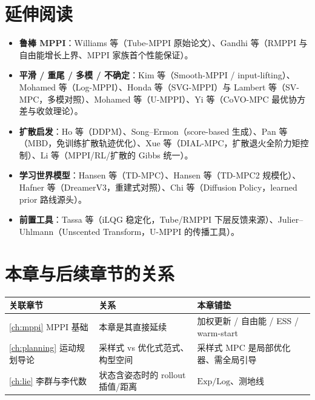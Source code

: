 \section*{延伸阅读}
\begin{itemize}
  \item \textbf{鲁棒 MPPI}：Williams 等\cite{williams2018robust}（Tube-MPPI 原始论文）、Gandhi 等\cite{gandhi2021robust}（RMPPI 与自由能增长上界、MPPI 家族首个性能保证）。
  \item \textbf{平滑 / 重尾 / 多模 / 不确定}：Kim 等\cite{kim2022smooth}（Smooth-MPPI / input-lifting）、Mohamed 等\cite{mohamed2022logmppi}（Log-MPPI）、Honda 等\cite{honda2024svgmppi}（SVG-MPPI）与 Lambert 等\cite{lambert2020svmpc}（SV-MPC，多模对照）、Mohamed 等\cite{mohamed2025umppi}（U-MPPI）、Yi 等\cite{yi2024covo}（CoVO-MPC 最优协方差与收敛理论）。
  \item \textbf{扩散启发}：Ho 等\cite{ho2020ddpm}（DDPM）、Song--Ermon\cite{song2019score}（score-based 生成）、Pan 等\cite{pan2024mbd}（MBD，免训练扩散轨迹优化）、Xue 等\cite{xue2025dial}（DIAL-MPC，扩散退火全阶力矩控制）、Li 等\cite{li2025unified}（MPPI/RL/扩散的 Gibbs 统一）。
  \item \textbf{学习世界模型}：Hansen 等\cite{hansen2022tdmpc}（TD-MPC）、Hansen 等\cite{hansen2024tdmpc2}（TD-MPC2 规模化）、Hafner 等\cite{hafner2023dreamerv3}（DreamerV3，重建式对照）、Chi 等\cite{chi2023diffusion}（Diffusion Policy，learned prior 路线源头）。
  \item \textbf{前置工具}：Tassa 等\cite{tassa2012ilqg}（iLQG 稳定化，Tube/RMPPI 下层反馈来源）、Julier--Uhlmann\cite{julier1997unscented}（Unscented Transform，U-MPPI 的传播工具）。
\end{itemize}

\section*{本章与后续章节的关系}
\begin{table}[H]\centering\small
\begin{tabular}{lll}
\toprule
关联章节 & 关系 & 本章铺垫 \\
\midrule
\cref{ch:mppi} MPPI 基础 & 本章是其直接延续 & 加权更新 / 自由能 / ESS / warm-start \\
\cref{ch:planning} 运动规划导论 & 采样式 vs 优化式范式、构型空间 & 采样式 MPC 是局部优化器、需全局引导 \\
\cref{ch:lie} 李群与李代数 & 状态含姿态时的 rollout 插值/距离 & $\mathrm{Exp}/\mathrm{Log}$、测地线 \\
\bottomrule
\end{tabular}
\end{table}

